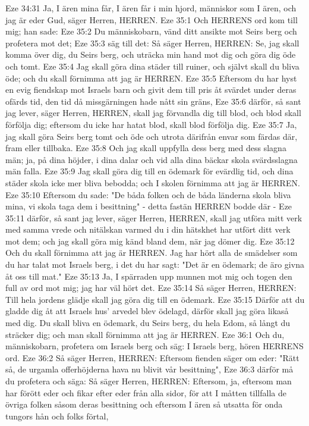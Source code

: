 Eze 34:31  Ja, I ären mina får, I ären får i min hjord, människor som I ären, och jag är eder Gud, säger Herren, HERREN.
Eze 35:1  Och HERRENS ord kom till mig; han sade:
Eze 35:2  Du människobarn, vänd ditt ansikte mot Seirs berg och profetera mot det;
Eze 35:3  säg till det: Så säger Herren, HERREN: Se, jag skall komma över dig, du Seirs berg, och uträcka min hand mot dig och göra dig öde och tomt.
Eze 35:4  Jag skall göra dina städer till ruiner, och självt skall du bliva öde; och du skall förnimma att jag är HERREN.
Eze 35:5  Eftersom du har hyst en evig fiendskap mot Israels barn och givit dem till pris åt svärdet under deras ofärds tid, den tid då missgärningen hade nått sin gräns,
Eze 35:6  därför, så sant jag lever, säger Herren, HERREN, skall jag förvandla dig till blod, och blod skall förfölja dig; eftersom du icke har hatat blod, skall blod förfölja dig.
Eze 35:7  Ja, jag skall göra Seirs berg tomt och öde och utrota därifrån envar som färdas där, fram eller tillbaka.
Eze 35:8  Och jag skall uppfylla dess berg med dess slagna män; ja, på dina höjder, i dina dalar och vid alla dina bäckar skola svärdsslagna män falla.
Eze 35:9  Jag skall göra dig till en ödemark för evärdlig tid, och dina städer skola icke mer bliva bebodda; och I skolen förnimma att jag är HERREN.
Eze 35:10  Eftersom du sade: "De båda folken och de båda länderna skola bliva mina, vi skola taga dem i besittning" - detta fastän HERREN bodde där -
Eze 35:11  därför, så sant jag lever, säger Herren, HERREN, skall jag utföra mitt verk med samma vrede och nitälskan varmed du i din hätskhet har utfört ditt verk mot dem; och jag skall göra mig känd bland dem, när jag dömer dig.
Eze 35:12  Och du skall förnimma att jag är HERREN. Jag har hört alla de smädelser som du har talat mot Israels berg, i det du har sagt: "Det är en ödemark; de äro givna åt oss till mat."
Eze 35:13  Ja, I spärraden upp munnen mot mig och togen den full av ord mot mig; jag har väl hört det.
Eze 35:14  Så säger Herren, HERREN: Till hela jordens glädje skall jag göra dig till en ödemark.
Eze 35:15  Därför att du gladde dig åt att Israels hus' arvedel blev ödelagd, därför skall jag göra likaså med dig. Du skall bliva en ödemark, du Seirs berg, du hela Edom, så långt du sträcker dig; och man skall förnimma att jag är HERREN.
Eze 36:1  Och du, människobarn, profetera om Israels berg och säg: I Israels berg, hören HERRENS ord.
Eze 36:2  Så säger Herren, HERREN: Eftersom fienden säger om eder: "Rätt så, de urgamla offerhöjderna hava nu blivit vår besittning",
Eze 36:3  därför må du profetera och säga: Så säger Herren, HERREN: Eftersom, ja, eftersom man har förött eder och fikar efter eder från alla sidor, för att I måtten tillfalla de övriga folken såsom deras besittning och eftersom I ären så utsatta för onda tungors hån och folks förtal,
